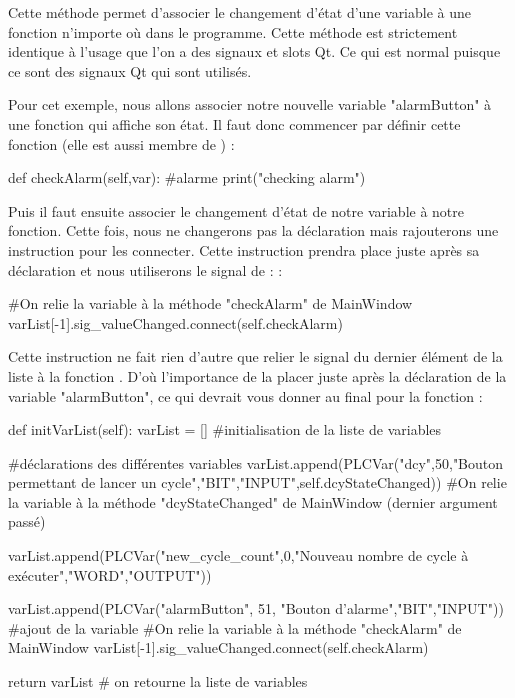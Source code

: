 \documentclass[12pt]{report}    %
\begin{document}
 Cette méthode permet d'associer le changement d'état d'une variable à une fonction n'importe où dans le programme.
\newline
Cette méthode est strictement identique à l'usage que l'on a des signaux et slots Qt. Ce qui est normal puisque ce sont des signaux Qt qui sont utilisés.
\smallSkip
\textcolor{red}{}  \textcolor{red}{}
\smallSkip

Pour cet exemple, nous allons associer notre nouvelle variable "alarmButton" à une fonction qui affiche son état.\newline
Il faut donc commencer par définir cette fonction (elle est aussi membre de ) :
\begin{pyCode}
def checkAlarm(self,var):
		#alarme
		print("checking alarm")
\end{pyCode}
\smallSkip

Puis il faut ensuite associer le changement d'état de notre variable à notre fonction. Cette fois, nous ne changerons pas la déclaration mais rajouterons une instruction pour les connecter.\newline
Cette instruction prendra place juste après sa déclaration et nous utiliserons le signal de  :  :
\begin{pyCode}
#On relie la variable à la méthode "checkAlarm" de MainWindow
varList[-1].sig_valueChanged.connect(self.checkAlarm)
\end{pyCode}
Cette instruction ne fait rien d'autre que relier le signal  du dernier élément de la liste  à la fonction .\newline
D'où l'importance de la placer juste après la déclaration de la variable "alarmButton", ce qui devrait vous donner au final pour la fonction  :

\begin{pyCode}
def initVarList(self):
	varList = []  #initialisation de la liste de variables


	#déclarations des différentes variables
	varList.append(PLCVar("dcy",50,"Bouton permettant de lancer un cycle","BIT","INPUT",self.dcyStateChanged))
	#On relie la variable à la méthode "dcyStateChanged" de MainWindow (dernier argument passé)

	varList.append(PLCVar("new_cycle_count",0,"Nouveau nombre de cycle à exécuter","WORD","OUTPUT"))

	varList.append(PLCVar("alarmButton", 51, "Bouton d'alarme","BIT","INPUT")) #ajout de la variable
	#On relie la variable à la méthode "checkAlarm" de MainWindow
	varList[-1].sig_valueChanged.connect(self.checkAlarm)

	return varList  # on retourne la liste de variables
\end{pyCode}
\end{document}
